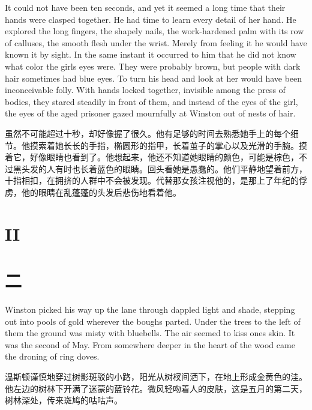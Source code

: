 \begin{paracol}{2}
It could not have been ten seconds, and yet it seemed a long time that
their hands were clasped together. He had time to learn every detail of
her hand. He explored the long fingers, the shapely nails, the
work-hardened palm with its row of calluses, the smooth flesh under the
wrist. Merely from feeling it he would have known it by sight. In the
same instant it occurred to him that he did not know what color the
girl\textquotesingle s eyes were. They were probably brown, but people
with dark hair sometimes had blue eyes. To turn his head and look at her
would have been inconceivable folly. With hands locked together,
invisible among the press of bodies, they stared steadily in front of
them, and instead of the eyes of the girl, the eyes of the aged prisoner
gazed mournfully at Winston out of nests of hair.

\switchcolumn

虽然不可能超过十秒，却好像握了很久。他有足够的时间去熟悉她手上的每个细节。他摸索着她长长的手指，椭圆形的指甲，长着茧子的掌心以及光滑的手腕。摸着它，好像眼睛也看到了。他想起来，他还不知道她眼睛的颜色，可能是棕色，不过黑头发的人有时也长着蓝色的眼睛。回头看她是愚蠢的。他们平静地望着前方，十指相扣，在拥挤的人群中不会被发现。代替那女孩注视他的，是那上了年纪的俘虏，他的眼睛在乱蓬蓬的头发后悲伤地看着他。

\switchcolumn*


\section{II}\label{ii-1}

\switchcolumn

\section*{二}\label{ux5341}

\switchcolumn*

Winston picked his way up the lane through dappled light and shade,
stepping out into pools of gold wherever the boughs parted. Under the
trees to the left of them the ground was misty with bluebells. The air
seemed to kiss one\textquotesingle s skin. It was the second of May.
From somewhere deeper in the heart of the wood came the droning of ring
doves.

\switchcolumn

温斯顿谨慎地穿过树影斑驳的小路，阳光从树杈间洒下，在地上形成金黄色的洼。他左边的树林下开满了迷蒙的蓝铃花。微风轻吻着人的皮肤，这是五月的第二天，树林深处，传来斑鸠的咕咕声。


\end{paracol}
